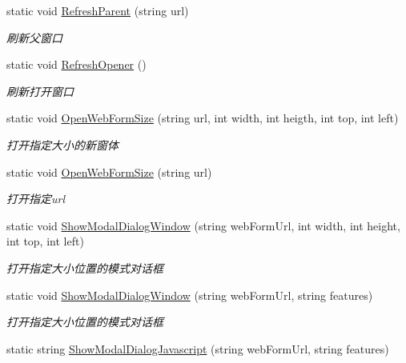 \begin{DoxyCompactItemize}
static void \hyperlink{class_x_c_l_net_tools_1_1_javascript_1_1_jscript_a6f2c5e702c2381bd77f86463693340cb}{Refresh\+Parent} (string url)
\begin{DoxyCompactList}\small\item\em 刷新父窗口 \end{DoxyCompactList}\item 
static void \hyperlink{class_x_c_l_net_tools_1_1_javascript_1_1_jscript_ad0de2aa10ba5437ea797513703b50e64}{Refresh\+Opener} ()
\begin{DoxyCompactList}\small\item\em 刷新打开窗口 \end{DoxyCompactList}\item 
static void \hyperlink{class_x_c_l_net_tools_1_1_javascript_1_1_jscript_ab16b9ee41a91197d9517ecfb6920c2a5}{Open\+Web\+Form\+Size} (string url, int width, int heigth, int top, int left)
\begin{DoxyCompactList}\small\item\em 打开指定大小的新窗体 \end{DoxyCompactList}\item 
static void \hyperlink{class_x_c_l_net_tools_1_1_javascript_1_1_jscript_aba38ab9b4225ae46f2a2b043ae90cbfd}{Open\+Web\+Form\+Size} (string url)
\begin{DoxyCompactList}\small\item\em 打开指定url \end{DoxyCompactList}\item 
static void \hyperlink{class_x_c_l_net_tools_1_1_javascript_1_1_jscript_a2a6b3bcc01894290fbbf4835a328d396}{Show\+Modal\+Dialog\+Window} (string web\+Form\+Url, int width, int height, int top, int left)
\begin{DoxyCompactList}\small\item\em 打开指定大小位置的模式对话框 \end{DoxyCompactList}\item 
static void \hyperlink{class_x_c_l_net_tools_1_1_javascript_1_1_jscript_a793a61a17a63b03dca9adb8f0523f5bf}{Show\+Modal\+Dialog\+Window} (string web\+Form\+Url, string features)
\begin{DoxyCompactList}\small\item\em 打开指定大小位置的模式对话框 \end{DoxyCompactList}\item 
static string \hyperlink{class_x_c_l_net_tools_1_1_javascript_1_1_jscript_a9171e2ec7c8e1f0092c0ec0ef2618096}{Show\+Modal\+Dialog\+Javascript} (string web\+Form\+Url, string features)

\end{DoxyCompactItemize}
